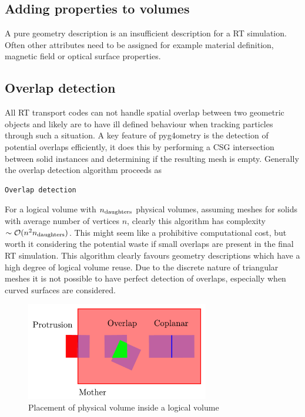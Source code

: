 \documentclass[final,5p,times,twocolumn]{elsarticle}
\begin{document}
\subsection{Adding properties to volumes}
A pure geometry description is an insufficient description for a RT simulation. Often other attributes need to be assigned for example material definition, magnetic field or  
optical surface properties.  

\subsection{Overlap detection}
All RT transport codes can not handle spatial overlap between two geometric objects and likely are to have ill defined behaviour when tracking particles  
through such a situation.  A key feature of pyg4ometry is the detection of potential overlaps efficiently, it does this by performing a CSG intersection between solid instances 
and determining if the resulting mesh is empty. Generally the overlap detection algorithm proceeds as 

{\small 
\begin{verbatim}
Overlap detection
\end{verbatim}
} 

For a logical volume with $n_{\rm daughters}$ physical volumes, assuming meshes for solids with average number of vertices $n$, clearly this algorithm has complexity $\sim \mathcal{O}(n^2 n_{\rm daughters})$. This might seem like a prohibitive computational cost, but worth it considering the potential waste if small overlaps are present in the final 
RT simulation. This algorithm clearly favours geometry descriptions which have a high degree of logical volume reuse. Due to the discrete nature of triangular meshes it is not possible to have perfect detection of overlaps, especially when curved surfaces are considered. 
 \begin{figure}[htbp]
\begin{center}
\includegraphics[width=8cm]{./diagrams/overlap.pdf}
\caption{Placement of physical volume inside a logical volume}
\label{fig:lvToPv}
\end{center}
\end{figure} 
\end{document}
